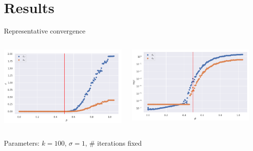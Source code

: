 \documentclass{beamer}
\begin{document}
\section{Results}
\begin{frame}{Representative convergence}
	\begin{minipage}[0.95\textheight]{\textwidth}
	\begin{columns}[T]
	\begin{column}{0.50\textwidth}
	\includegraphics[width=\textwidth, keepaspectratio]{../images/N100_sigma1.png}
	\end{column}
	\begin{column}{0.50\textwidth}
	\includegraphics[width=\textwidth, keepaspectratio]{../images/N100_sigma1log.png}
	\end{column}
	\end{columns}
	\end{minipage}
	\begin{center}
		Parameters: $k=100$, $\sigma=1$, \# iterations fixed
	\end{center}
\end{frame}
\end{document}
